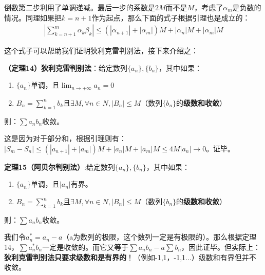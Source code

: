 \documentclass{ctexart}
\let\oldtextbf\textbf
\renewcommand{\textbf}[1]{\textcolor{brown!50!red}{\oldtextbf{#1}}}
\begin{document}
倒数第二步利用了单调递减。最后一步的系数是$2M$而不是$M$，考虑了$\alpha_m$是负数的情况。同理如果把$k=n+1$作为起点，那么下面的式子根据引理也是成立的：
\begin{align*} 
 |\sum_{k=n+1}^m \alpha_k\beta_k|\leq (|\alpha_{n+1}|+|\alpha_m|)M+|\alpha_n|M+|\alpha_m|M
\end{align*}

这个式子可以帮助我们证明狄利克雷判别法，接下来介绍之：
\begin{tcolorbox}[
    colback=bac2,     %
    colframe=fra2,   %
    coltitle=white,             %
    coltext=tex2,
    title=狄利克雷判别法,
    fonttitle=\bfseries,        %
arc=3mm,                     %
breakable
]
\textbf{\color{brown!50!red}（定理14）狄利克雷判别法}：给定数列$\{a_n\},\{b_n\}$，其中如果：
\begin{enumerate}
    \item $\{a_n\}$单调，且$\lim_{n\to+\infty}a_n=0$
    \item $B_n=\sum_{k=1}^n b_k$且$\exists M,\forall n\in N,|B_n|\leq M$（数列$\{b_n\}$的\textbf{\color{brown!50!red}级数和收敛}）
\end{enumerate}

则：$\sum a_nb_n$收敛。
\end{tcolorbox}

这是因为对于部分和，根据引理则有：$|S_m-S_n|\leq(|a_{n+1}|+|a_m|)M+|a_n|M+|a_m|M\leq 4M|a_n|\to 0$。证毕。
\begin{tcolorbox}[
    colback=bac2,     %
    colframe=fra2,   %
    coltitle=white,             %
    coltext=tex2,
    title=阿贝尔判别法,
    fonttitle=\bfseries,        %
arc=3mm,                     %
breakable
]
\textcolor{brown!50!red}{\textbf{定理15（阿贝尔判别法）}}:给定数列$\{a_n\},\{b_n\}$，其中如果：
\begin{enumerate}
    \item $\{a_n\}$单调，且$|a_n|$有界。
    \item $B_n=\sum_{k=1}^n b_k$且$\exists M,\forall n\in N,|B_n|\leq M$（数列$\{b_n\}$的\textbf{\color{brown!50!red}级数和收敛}）
\end{enumerate}
则：$\sum a_nb_n$收敛。
\end{tcolorbox}
我们令$a_n^*=a_n-a$（a为数列的极限，这个数列一定是有极限的）。那么根据定理14，$\sum a_n^*b_n$一定是收敛的。而它又等于$\sum a_nb_n-a\sum b_n$，因此证毕。但实际上：\textbf{\color{brown!50!red}狄利克雷判别法只要求级数和是有界的}！（例如-1,1，-1,1...）级数和有界但并不收敛。
\end{document}
